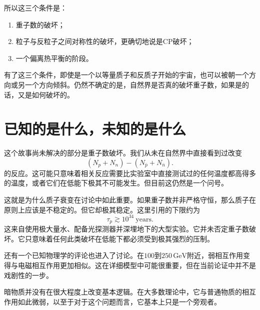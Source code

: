 所以这三个条件是：
\begin{enumerate}
\item 重子数的破坏；
\item 粒子与反粒子之间对称性的破坏，更确切地说是CP破坏；
\item 一个偏离热平衡的阶段。
\end{enumerate}

\begin{classroomqa}
\end{classroomqa}

有了这三个条件，即使是一个以等量质子和反质子开始的宇宙，也可以被朝一个方向或另一个方向倾斜。仍然不确定的是，自然界是否真的破坏重子数，如果是的话，又是如何破坏的。

\section{已知的是什么，未知的是什么}

这个故事尚未解决的部分是重子数破坏。我们从未在自然界中直接看到过改变
\[
(N_p+N_n)-(N_{\bar p}+N_{\bar n}).
\]
的反应。这可能只意味着相关反应需要比实验室中直接测试过的任何温度都高得多的温度，或者它们在低能下极其不可能发生。但目前这仍然是一个问号。

这就是为什么质子衰变在讨论中如此重要。如果重子数并非严格守恒，那么质子在原则上应该是不稳定的。但它却极其稳定。这里引用的下限约为
\[
\tau_p \gtrsim 10^{34}\ \text{years}.
\]
这来自使用极大量水、配备光探测器并深埋地下的大型实验。它并未否定重子数破坏。它只意味着任何此类破坏在低能下都必须受到极其强烈的压制。

还有一个已知物理学的评论也进入了讨论。在\(100\)到\(250\,\mathrm{GeV}\)附近，弱相互作用变得与电磁相互作用更加相似。这在详细模型中可能很重要，但在当前论证中并不是戏剧性的一步。

暗物质并没有在很大程度上改变基本逻辑。在大多数理论中，它与普通物质的相互作用如此微弱，以至于对于这个问题而言，它基本上只是一个旁观者。

\begin{classroomqa}
\end{classroomqa}

